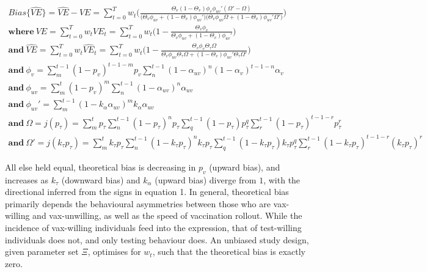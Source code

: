 \documentclass[12pt]{article}
\begin{document}
\begin{eqnarray}
	{Bias}\{\widehat{VE}\} = \widehat{VE} - VE = \sum_{t=0}^{T} w_{t} \bigg( \frac{\Theta_{v} ( 1 - \Theta_{v} ) \phi_v \phi_{uv}' ( \Omega' - \Omega ) }{\big( \Theta_{v} \phi_{uv} + (1 - \Theta_{v}) \phi_{uv}'  \big) \big( \Theta_{v} \phi_{uv} \Omega + ( 1 - \Theta_{v}) \phi_{uv}' \Omega' \big)} \bigg) \\ 
	\textbf{where} \ VE = \sum_{t=0}^{T} w_{t} VE_{t} = \sum_{t=0}^{T} w_{t} \Big( 1 - \frac{\Theta_{v}\phi_v}{\Theta_{v} \phi_{uv} + (1 - \Theta_{v}) \phi_{uv}' } \Big) \\
	\textbf{and} \ \widehat{VE} = \sum_{t=0}^{T} w_{t} \widehat{VE}_{t} = \sum_{t=0}^{T} w_{t} \Big( 1 - \frac{\Theta_{v}\phi_v\Theta_{\tau}\Omega }{\Theta_{v} \phi_{uv}\Theta_{\tau}\Omega + (1 - \Theta_{v}) \phi_{uv}'\Theta_{\tau}\Omega' } \Big) \\ 
	\textbf{and} \ \phi_v = \sum_{m}^{t-1} (1-p_v)^{t-1-m} p_v \sum_{n}^{t-1}(1-\alpha_{uv})^{n}(1-\alpha_{v})^{t-1-n}\alpha_{v} \\
	\textbf{and} \ \phi_{uv} = \sum_{m}^{t} (1-p_v)^{m} \sum_{n}^{t-1} (1-\alpha_{uv})^{n}\alpha_{uv} \\
	\textbf{and} \ \phi_{uv}' = \sum_{m}^{t-1} (1- k_\alpha \alpha_{uv})^{m} k_\alpha \alpha_{uv} \\
	\textbf{and} \ \Omega = j(p_\tau) = \sum_{m}^{t} p_{\tau} \sum_{n}^{t-1} (1-p_{\tau})^{n}p_{\tau} \sum_{q}^{t-1} (1-p_{\tau})p_{\tau}^{q} \sum_{r}^{t-1} (1-p_{\tau})^{t-1-r} p_{\tau}^{r} \\ 
	\textbf{and} \ \Omega' = j(k_\tau p_\tau) = \sum_{m}^{t} k_{\tau} p_{\tau} \sum_{n}^{t-1} (1- k_{\tau} p_{\tau})^{n} k_{\tau} p_{\tau} \sum_{q}^{t-1} (1- k_{\tau} p_{\tau}) k_{\tau} p_{\tau}^{q} \sum_{r}^{t-1} (1- k_{\tau} p_{\tau})^{t-1-r} (k_{\tau} p_{\tau})^{r}	
\end{eqnarray}

All else held equal, theoretical bias is decreasing in $p_v$ (upward bias), and increases as $k_{\tau}$ (downward bias) and $k_{\alpha}$ (upward bias) diverge from $1$, with the directional inferred from the signs in equation 1. In general, theoretical bias primarily depends the behavioural asymmetries between those who are vax-willing and vax-unwilling, as well as the speed of vaccination rollout. While the incidence of vax-willing individuals feed into the expression, that of test-willing individuals does not, and only testing behaviour does. An unbiased study design, given parameter set $\Xi$, optimises for $w_t$, such that the theoretical bias is exactly zero.
\end{document}
